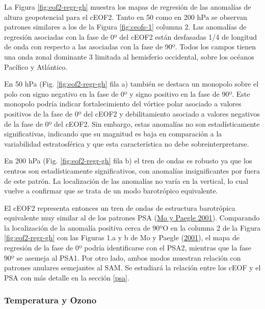 \documentclass[12pt,oneside,a4paper]{reedthesis}
\begin{document}
La Figura \ref{fig:eof2-regr-gh} muestra los mapas de regresión de las anomalías de altura geopotencial para el cEOF2.
Tanto en 50 como en 200 hPa se observan patrones similares a los de la Figura \ref{fig:ceofs-1} columna 2.
Las anomalías de regresión asociadas con la fase de 0º del cEOF2 están desfasadas 1/4 de longitud de onda con respecto a las asociadas con la fase de 90º.
Todos los campos tienen una onda zonal dominante 3 limitada al hemisferio occidental, sobre los océanos Pacífico y Atlántico.

En 50 hPa (Fig. \ref{fig:eof2-regr-gh} fila a) también se destaca un monopolo sobre el polo con signo negativo en la fase de 0º y signo positivo en la fase de 90º.
Este monopolo podría indicar fortalecimiento del vórtice polar asociado a valores positivos de la fase de 0º del cEOF2 y debilitamiento asociado a valores negativos de la fase de 0º del cEOF2.
Sin embargo, estas anomalías no son estadísticamente significativas, indicando que su magnitud es baja en comparación a la variabilidad estratosférica y que esta característica no debe sobreinterpretarse.

En 200 hPa (Fig. \ref{fig:eof2-regr-gh} fila b) el tren de ondas es robusto ya que los centros son estadísticamente significativos, con anomalías insignificantes por fuera de este patrón.
La localización de las anomalías no varía en la vertical, lo cual vuelve a confirmar que se trata de un modo barotrópico equivalente.

El cEOF2 representa entonces un tren de ondas de estructura barotrópica equivalente muy similar al de los patrones PSA (\protect\hyperlink{ref-mo2001}{Mo y Paegle 2001}).
Comparando la localización de la anomalía positiva cerca de 90ºO en la columna 2 de la Figura \ref{fig:eof2-regr-gh} con las Figuras 1.a y b de Mo y Paegle (\protect\hyperlink{ref-mo2001}{2001}), el mapa de regresión de la fase de 0º podría identificarse con el PSA2, mientras que la fase 90º se asemeja al PSA1.
Por otro lado, ambos modos muestran relación con patrones anulares semejantes al SAM.
Se estudiará la relación entre los cEOF y el PSA con más detalle en la sección \ref{psa}.

\hypertarget{temperatura-y-ozono}{%
\subsubsection{Temperatura y Ozono}\label{temperatura-y-ozono}}
\end{document}
